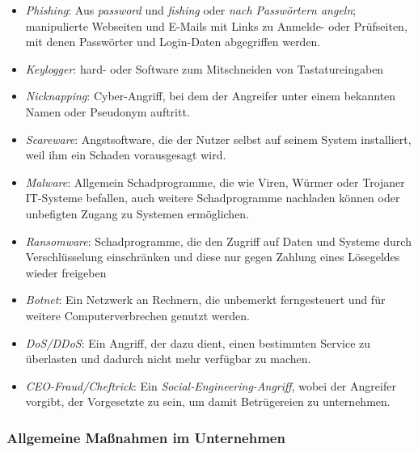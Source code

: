 \documentclass[a4paper, 12pt]{report}
\begin{document}
\begin{multicols}{2}
\begin{itemize}
    \item \emph{Phishing}: Aus \emph{password} und \emph{fishing} oder
    \emph{nach Passwörtern angeln}; manipulierte Webseiten und E-Mails mit Links
    zu Anmelde- oder Prüfseiten, mit denen Passwörter und Login-Daten
    abgegriffen werden.
    \item \emph{Keylogger}: hard- oder Software zum Mitschneiden von
    Tastatureingaben
    \item \emph{Nicknapping}: Cyber-Angriff, bei dem der Angreifer unter einem
    bekannten Namen oder Pseudonym auftritt.
    \item \emph{Scareware}: Angstsoftware, die der Nutzer selbst auf seinem
    System installiert, weil ihm ein Schaden vorausgesagt wird.
    \item \emph{Malware}: Allgemein Schadprogramme, die wie Viren, Würmer oder
    Trojaner IT-Systeme befallen, auch weitere Schadprogramme nachladen können
    oder unbefigten Zugang zu Systemen ermöglichen.
    \item \emph{Ransomware}: Schadprogramme, die den Zugriff auf Daten und
    Systeme durch Verschlüsselung einschränken und diese nur gegen Zahlung eines
    Lösegeldes wieder freigeben
    \item \emph{Botnet}: Ein Netzwerk an Rechnern, die unbemerkt ferngesteuert
    und für weitere Computerverbrechen genutzt werden.
    \item \emph{DoS/DDoS}: Ein Angriff, der dazu dient, einen bestimmten Service
    zu überlasten und dadurch nicht mehr verfügbar zu machen.
    \item  \emph{CEO-Fraud/Cheftrick}: Ein \emph{Social-Engineering-Angriff},
    wobei der Angreifer vorgibt, der Vorgesetzte zu sein, um damit Betrügereien
    zu unternehmen.
\end{itemize}

\subsubsection{Allgemeine Maßnahmen im Unternehmen}


\end{multicols}
\end{document}
